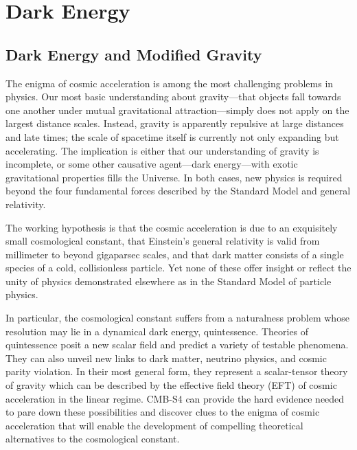 
\def\gtrsim{\raise-.75ex\hbox{$\buildrel>\over\sim$}}
\def\lsim{\raise-.75ex\hbox{$\buildrel<\over\sim$}}

\chapter{Dark Energy}

\bigskip

\begin{quotation}



\end{quotation}

\section{Dark Energy and Modified Gravity}


The enigma of cosmic acceleration is among the most challenging problems in physics. Our most basic understanding about gravity---that objects fall towards one another under mutual gravitational attraction---simply does not apply on the largest distance scales. Instead, gravity is apparently repulsive at large distances and late times; the scale of spacetime itself is currently not only expanding but accelerating. The implication is either that our understanding of gravity is incomplete, or some other causative agent---dark energy---with exotic gravitational properties fills the Universe. In both cases, new physics is required beyond the four fundamental forces described by the Standard Model and general relativity.

The working hypothesis is that the cosmic acceleration is due to an exquisitely small cosmological constant, that Einstein's general relativity is valid from millimeter to beyond gigaparsec scales, and that dark matter consists of a single species of a cold, collisionless particle. Yet none of these offer insight or reflect the unity of physics demonstrated elsewhere as in the Standard Model of particle physics.

In particular, the cosmological constant suffers from a naturalness problem whose resolution may lie in a dynamical dark energy, quintessence. Theories of quintessence posit a new scalar field and predict a variety of testable phenomena.  They can also unveil new links to dark matter, neutrino physics, and cosmic parity violation. In their most general form, they represent
a scalar-tensor theory of gravity which can be described by  the effective field theory (EFT) of cosmic acceleration in the linear regime. 
CMB-S4 can provide the hard evidence  needed to pare down these possibilities and discover clues to the enigma of cosmic acceleration that will enable the development of  compelling theoretical 
alternatives to the cosmological constant.

